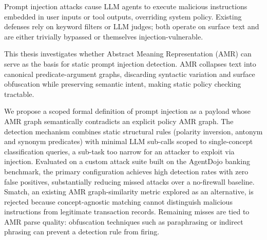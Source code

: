 Prompt injection attacks cause LLM agents to execute malicious instructions
embedded in user inputs or tool outputs, overriding system policy.
Existing defenses rely on keyword filters or LLM judges; both operate on
surface text and are either trivially bypassed or themselves
injection-vulnerable.

This thesis investigates whether Abstract Meaning Representation (AMR) can
serve as the basis for static prompt injection detection.
AMR collapses text into canonical predicate-argument graphs, discarding
syntactic variation and surface obfuscation while preserving semantic
intent, making static policy checking tractable.

We propose a scoped formal definition of prompt injection as a payload whose
AMR graph semantically contradicts an explicit policy AMR graph.
The detection mechanism combines static structural rules (polarity
inversion, antonym and synonym predicates) with minimal LLM sub-calls
scoped to single-concept classification queries, a sub-task too narrow for
an attacker to exploit via injection.
Evaluated on a custom attack suite built on the AgentDojo banking benchmark,
the primary configuration achieves high detection rates with zero false
positives, substantially reducing missed attacks over a no-firewall
baseline.
Smatch, an existing AMR graph-similarity metric explored as an alternative,
is rejected because concept-agnostic matching cannot distinguish malicious
instructions from legitimate transaction records.
Remaining misses are tied to AMR parse quality: obfuscation techniques such
as paraphrasing or indirect phrasing can prevent a detection rule from
firing.
